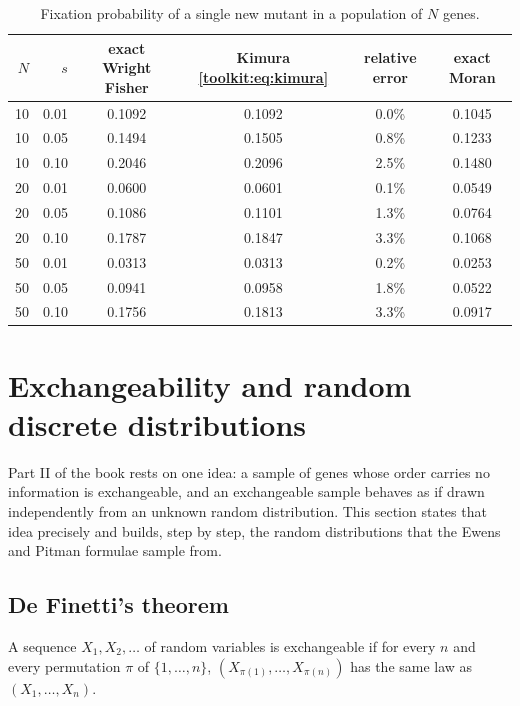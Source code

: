 \begin{table}[t]
\centering\small
\caption{Fixation probability of a single new mutant in a population of $N$ genes.}
\label{toolkit:tab:fix}
\begin{tabular}{rrcccc}
\toprule
$N$ & $s$ & exact Wright Fisher & Kimura \eqref{toolkit:eq:kimura} & relative error & exact Moran\\
\midrule
10 & 0.01 & 0.1092 & 0.1092 & 0.0\% & 0.1045\\
10 & 0.05 & 0.1494 & 0.1505 & 0.8\% & 0.1233\\
10 & 0.10 & 0.2046 & 0.2096 & 2.5\% & 0.1480\\
20 & 0.01 & 0.0600 & 0.0601 & 0.1\% & 0.0549\\
20 & 0.05 & 0.1086 & 0.1101 & 1.3\% & 0.0764\\
20 & 0.10 & 0.1787 & 0.1847 & 3.3\% & 0.1068\\
50 & 0.01 & 0.0313 & 0.0313 & 0.2\% & 0.0253\\
50 & 0.05 & 0.0941 & 0.0958 & 1.8\% & 0.0522\\
50 & 0.10 & 0.1756 & 0.1813 & 3.3\% & 0.0917\\
\bottomrule
\end{tabular}
\end{table}

\section{Exchangeability and random discrete distributions}\label{toolkit:sec:exch}

Part II of the book rests on one idea: a sample of genes whose order carries no information is
exchangeable, and an exchangeable sample behaves as if drawn independently from an unknown
random distribution. This section states that idea precisely and builds, step by step, the random
distributions that the Ewens and Pitman formulae sample from.

\subsection{De Finetti's theorem}\label{toolkit:sec:definetti}

\begin{definition}[Exchangeability]\label{toolkit:def:exch}
A sequence $X_1,X_2,\dots$ of random variables is exchangeable if for every $n$ and every
permutation $\pi$ of $\{1,\dots,n\}$, $(X_{\pi(1)},\dots,X_{\pi(n)})$ has the same law as
$(X_1,\dots,X_n)$.
\end{definition}

